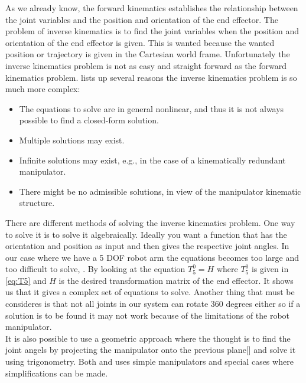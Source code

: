 As we already know, the forward kinematics establishes the relationship between the joint variables and the position and orientation of the end effector. The problem of inverse kinematics is to find the joint variables when the position and orientation of the end effector is given. This is wanted because the wanted position or trajectory is given in the Cartesian world frame. Unfortunately the inverse kinematics problem is not as easy and straight forward as the forward kinematics problem. \cite{Siciliano} lists up several reasons the inverse kinematics problem is so much more complex:
\begin{itemize}
    \item The equations to solve are in general nonlinear, and thus it is not always possible to find a closed-form solution.
    \item Multiple solutions may exist.
    \item Infinite solutions may exist, e.g., in the case of a kinematically redundant manipulator.
    \item There might be no admissible solutions, in view of the manipulator kinematic structure.
\end{itemize}
There are different methods of solving the inverse kinematics problem. One way to solve it is to solve it algebraically. Ideally you want a function that has the orientation and position as input and then gives the respective joint angles. In our case where we have a 5 DOF robot arm the equations becomes too large and too difficult to solve, \cite{spong}. By looking at the equation $T_5^0=H$ where $T_5^0$ is given in \eqref{eq:T5} and $H$ is the desired transformation matrix of the end effector. It shows us that it gives a complex set of equations to solve. Another thing that must be consideres is that not all joints in our system can rotate 360 degrees either so if a solution is to be found it may not work because of the limitations of the robot manipulator. \\

It is also possible to use a geometric approach where the thought is to find the joint angels by projecting the manipulator onto the previous plane[\cite{spong}] and solve it using trigonometry. Both \cite{spong} and \cite{Siciliano} uses simple manipulators and special cases where simplifications can be made. \\

